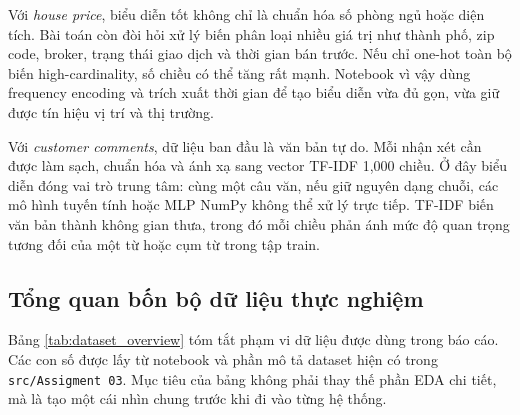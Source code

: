\documentclass[12pt,a4paper]{report}
\newcommand{\modelpath}[1]{\texttt{#1}}
\begin{document}
Với \textit{house price}, biểu diễn tốt không chỉ là chuẩn hóa số phòng ngủ hoặc diện tích.
Bài toán còn đòi hỏi xử lý biến phân loại nhiều giá trị như thành phố, zip code, broker, trạng thái giao dịch và thời gian bán trước.
Nếu chỉ one-hot toàn bộ biến high-cardinality, số chiều có thể tăng rất mạnh.
Notebook vì vậy dùng frequency encoding và trích xuất thời gian để tạo biểu diễn vừa đủ gọn, vừa giữ được tín hiệu vị trí và thị trường.

Với \textit{customer comments}, dữ liệu ban đầu là văn bản tự do.
Mỗi nhận xét cần được làm sạch, chuẩn hóa và ánh xạ sang vector TF-IDF 1,000 chiều.
Ở đây biểu diễn đóng vai trò trung tâm: cùng một câu văn, nếu giữ nguyên dạng chuỗi, các mô hình tuyến tính hoặc MLP NumPy không thể xử lý trực tiếp.
TF-IDF biến văn bản thành không gian thưa, trong đó mỗi chiều phản ánh mức độ quan trọng tương đối của một từ hoặc cụm từ trong tập train.

\subsection{Tổng quan bốn bộ dữ liệu thực nghiệm}
Bảng \ref{tab:dataset_overview} tóm tắt phạm vi dữ liệu được dùng trong báo cáo.
Các con số được lấy từ notebook và phần mô tả dataset hiện có trong \modelpath{src/Assigment 03}.
Mục tiêu của bảng không phải thay thế phần EDA chi tiết, mà là tạo một cái nhìn chung trước khi đi vào từng hệ thống.

\begin{table}[H]
\centering
\caption{Tổng quan các bộ dữ liệu trong Assignment 03}
\label{tab:dataset_overview}
\end{table}
\end{document}

